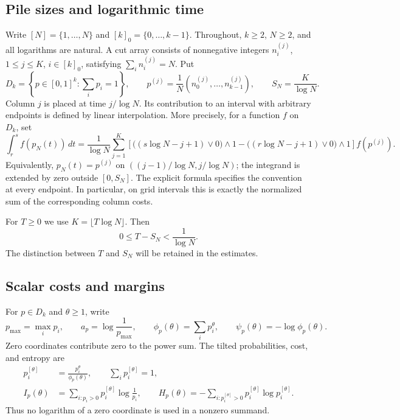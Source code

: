\documentclass[11pt]{article}
\numberwithin{equation}{section}
\theoremstyle{definition}
\theoremstyle{remark}
\newcommand{\1}{\mathbf 1}
\begin{document}
\subsection{Pile sizes and logarithmic time}

Write $[N]=\{1,\ldots,N\}$ and $[k]_0=\{0,\ldots,k-1\}$. Throughout,
$k\ge2$, $N\ge2$, and all logarithms are natural. A cut array consists of
nonnegative integers $n_i^{(j)}$, $1\le j\le K$, $i\in[k]_0$, satisfying
$\sum_i n_i^{(j)}=N$. Put
\[
 D_k=\left\{p\in[0,1]^k:\sum_i p_i=1\right\},\qquad
 p^{(j)}=\frac1N(n_0^{(j)},\ldots,n_{k-1}^{(j)}),\qquad
 S_N=\frac K{\log N}.
\]
Column $j$ is placed at time $j/\log N$. Its contribution to an interval
with arbitrary endpoints is defined by linear interpolation. More
precisely, for a function $f$ on $D_k$, set
\begin{equation}%
\label{eq:empirical-integral}
 \int_r^s f(p_N(t))\,dt
 =\frac1{\log N}\sum_{j=1}^K
 \left[\bigl((s\log N-j+1)\vee0\bigr)\wedge1
       -\bigl((r\log N-j+1)\vee0\bigr)\wedge1\right]f(p^{(j)}).
\end{equation}
Equivalently, $p_N(t)=p^{(j)}$ on
$((j-1)/\log N,j/\log N)$; the integrand is extended by zero outside
$[0,S_N]$. The explicit formula specifies the convention at every
endpoint. In particular, on grid intervals this is exactly the normalized
sum of the corresponding column costs.

For $T\ge0$ we use $K=\lfloor T\log N\rfloor$. Then
\begin{equation}%
\label{eq:horizon-rounding}
 0\le T-S_N<\frac1{\log N}.
\end{equation}
The distinction between $T$ and $S_N$ will be retained in the estimates.

\subsection{Scalar costs and margins}
\label{subsec:scalar-costs}

For $p\in D_k$ and $\theta\ge1$, write
\[
 p_{\max}=\max_i p_i,\qquad a_p=\log\frac1{p_{\max}},\qquad
 \phi_p(\theta)=\sum_i p_i^\theta,\qquad
 \psi_p(\theta)=-\log\phi_p(\theta).
\]
Zero coordinates contribute zero to the power sum. The tilted
probabilities, cost, and entropy are
\begin{align}%
\label{eq:tilted-costs}
 p_i^{[\theta]}&=\frac{p_i^\theta}{\phi_p(\theta)},\qquad
 \sum_i p_i^{[\theta]}=1,\nonumber\\
 I_p(\theta)&=\sum_{i:p_i>0}p_i^{[\theta]}\log\frac1{p_i},\qquad
 H_p(\theta)=-\sum_{i:p_i^{[\theta]}>0}p_i^{[\theta]}\log p_i^{[\theta]}.
\end{align}
Thus no logarithm of a zero coordinate is used in a nonzero summand.
\end{document}
